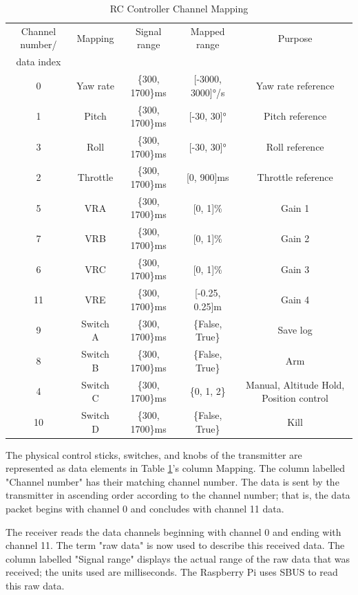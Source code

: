 \documentclass{article}
\begin{document}
\begin{table}[h]
  \centering
  \begin{tabular}{|c|c|c|c|c|}
    \hline
    Channel number/ & Mapping & Signal range & Mapped range & Purpose \\
    data index & & & & \\
    \hline
    0 & Yaw rate & \{300, 1700\}ms & [-3000, 3000]°/s & Yaw rate reference \\
    1 & Pitch & \{300, 1700\}ms & [-30, 30]° & Pitch reference \\
    3 & Roll & \{300, 1700\}ms & [-30, 30]° & Roll reference \\
    2 & Throttle & \{300, 1700\}ms & [0, 900]ms & Throttle reference \\
    5 & VRA & \{300, 1700\}ms & [0, 1]\% & Gain 1 \\
    7 & VRB & \{300, 1700\}ms & [0, 1]\% & Gain 2 \\
    6 & VRC & \{300, 1700\}ms & [0, 1]\% & Gain 3 \\
    11 & VRE & \{300, 1700\}ms & [-0.25, 0.25]m & Gain 4 \\
    9 & Switch A & \{300, 1700\}ms & \{False, True\} & Save log \\
    8 & Switch B & \{300, 1700\}ms & \{False, True\} & Arm \\
    4 & Switch C & \{300, 1700\}ms & \{0, 1, 2\} & Manual, Altitude Hold, Position control \\
    10 & Switch D & \{300, 1700\}ms & \{False, True\} & Kill \\
    \hline
  \end{tabular}
  \caption{RC Controller Channel Mapping}
  \label{figure:RC_Controller_Channel_Mapping}
\end{table}

The physical control sticks, switches, and knobs of the transmitter are represented as data elements in Table \ref{figure:RC_Controller_Channel_Mapping}'s column Mapping. The column labelled "Channel number" has their matching channel number. The data is sent by the transmitter in ascending order according to the channel number; that is, the data packet begins with channel 0 and concludes with channel 11 data.

The receiver reads the data channels beginning with channel 0 and ending with channel 11. The term "raw data" is now used to describe this received data. The column labelled "Signal range" displays the actual range of the raw data that was received; the units used are milliseconds. The Raspberry Pi uses SBUS to read this raw data.
\end{document}
